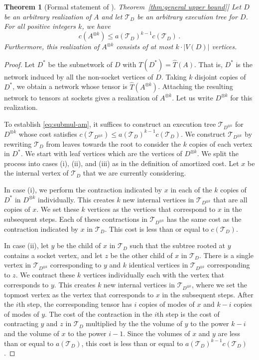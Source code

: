 \documentclass[11pt]{article}
\numberwithin{equation}{section}
\newtheorem{theorem}{Theorem}[section]
\theoremstyle{definition}
\theoremstyle{plain}
\newcommand{\expref}[2]{\hyperref[#2]{#1~\ref{#2}}}
\newcommand{\td}{\ensuremath{\mathcal{T}_D}}
\newcommand{\tdk}{\ensuremath{\mathcal{T}_{D^{\otimes k}}}}
\begin{document}
\begin{theorem}[Formal statement of \expref{Theorem}{thm:general upper bound}]
\label{thm:submul-am}
Let $D$ be an arbitrary realization of $A$ and let $\td$ be an arbitrary
execution tree for $D$. For all positive integers $k$, we have
\begin{equation}
\label{eq:submul-am}
c(A^{\otimes k})\leq a(\td)^{k-1} c(\td)\,.
\end{equation}
Furthermore, this realization of $A^{\otimes k}$ consists of
at most $k \cdot |V(D)|$ vertices.
\end{theorem}

\begin{proof}
Let $D^*$ be the subnetwork of $D$ with $T(D^*)=\hat{T}(A)$. That is,
$D^*$ is the network induced by all the non-socket vertices of $D$.
Taking $k$ disjoint copies of $D^*$, we obtain a network whose tensor is $\hat{T}(A^{\otimes k})$. Attaching the resulting network
to tensors at sockets gives a realization of $A^{\otimes k}$.
Let us write $D^{\otimes k}$ for this realization.

To establish \eqref{eq:submul-am}, it suffices to construct an execution
tree $\tdk$ for $D^{\otimes k}$ whose cost satisfies
$c(\tdk)\leq a(\td)^{k-1} c(\td)$. We construct $\tdk$
by rewriting $\td$ from leaves towards the root
to consider the $k$ copies of each vertex in $D^*$. We start with leaf vertices which are the vertices of $D^{\otimes k}$.
We split the process into cases (i), (ii), and (iii)
as in the definition of amortized cost.
Let $x$ be the internal vertex of $\td$ that we are currently considering.

In case (i), we perform the contraction indicated by $x$ in each of the
$k$ copies of $D^*$ in $D^{\otimes k}$ individually. This creates $k$ new internal vertices
in $\tdk$ that are all copies of $x$.  We set these $k$ vertices as the vertices
that correspond to $x$ in the subsequent steps. Each of these contractions in $\tdk$ has the
same cost as the contraction indicated by $x$ in $\td$. This cost is less than or equal to $c(\td)$.

In case (ii), let $y$ be the child of $x$ in $\td$ such that the subtree rooted at $y$ contains a socket vertex, and
let $z$ be the other child of $x$ in $\td$.
There is a single vertex in
$\tdk$ corresponding to $y$ and $k$ identical vertices
in $\tdk$
corresponding to $z$. We contract these $k$ vertices individually each with
the vertex that corresponds to $y$. This creates $k$ new internal vertices
in $\tdk$, where we set the topmost vertex as the vertex that corresponds
to $x$ in the subsequent steps. After the $i$th step, the corresponding tensor has $i$ copies of modes of $x$ and $k-i$ copies of modes of $y$. The cost of the  contraction in the $i$th step is the cost of contracting $y$ and $z$ in $\td$ multiplied by the the volume of $y$ to the power $k-i$ and the volume of $x$ to the power $i-1$. Since the volumes of $x$ and $y$ are less than or equal to $a(\td)$, this cost is less than or equal to $a(\td)^{k-1}c(\td)$.


\end{proof}
\end{document}
